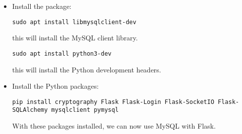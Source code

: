 \begin{itemize}
    \item Install the package:
    \begin{verbatim}
sudo apt install libmysqlclient-dev
    \end{verbatim}
    this will install the MySQL client library.
    \begin{verbatim}
sudo apt install python3-dev
    \end{verbatim}
    this will install the Python development headers.
    \item Install the Python packages:
    \begin{verbatim}
pip install cryptography Flask Flask-Login Flask-SocketIO Flask-SQLAlchemy mysqlclient pymysql
    \end{verbatim}
    With these packages installed, we can now use MySQL with Flask.
\end{itemize}
